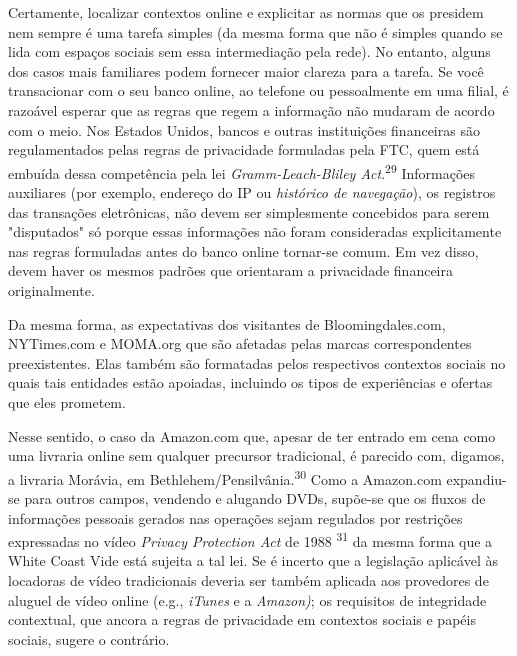 Certamente, localizar contextos online e explicitar as normas que os
presidem nem sempre é uma tarefa simples (da mesma forma que não é
simples quando se lida com espaços sociais sem essa intermediação pela
rede). No entanto, alguns dos casos mais familiares podem fornecer maior
clareza para a tarefa. Se você transacionar com o seu banco online, ao
telefone ou pessoalmente em uma filial, é razoável esperar que as regras
que regem a informação não mudaram de acordo com o meio. Nos Estados
Unidos, bancos e outras instituições financeiras são regulamentados
pelas regras de privacidade formuladas pela FTC, quem está embuída dessa
competência pela lei \emph{Gramm-Leach-Bliley
Act}.\textsuperscript{{29}} Informações auxiliares (por exemplo,
endereço do IP ou \emph{histórico de navegação}), os registros das
transações eletrônicas, não devem ser simplesmente concebidos para serem
"disputados" só porque essas informações não foram consideradas
explicitamente nas regras formuladas antes do banco online tornar-se
comum. Em vez disso, devem haver os mesmos padrões que orientaram a
privacidade financeira originalmente.

Da mesma forma, as expectativas dos visitantes de Bloomingdales.com,
NYTimes.com e MOMA.org que são afetadas pelas marcas correspondentes
preexistentes. Elas também são formatadas pelos respectivos contextos
sociais no quais tais entidades estão apoiadas, incluindo os tipos de
experiências e ofertas que eles prometem.

Nesse sentido, o caso da Amazon.com que, apesar de ter entrado em cena
como uma livraria online sem qualquer precursor tradicional, é parecido
com, digamos, a livraria Morávia, em
Bethlehem/Pensilvânia.\textsuperscript{{30}} Como a Amazon.com
expandiu-se para outros campos, vendendo e alugando DVDs, supõe-se que
os fluxos de informações pessoais gerados nas operações sejam regulados
por restrições expressadas no vídeo \emph{Privacy Protection Act} de
1988 \textsuperscript{{31}} da mesma forma que a White Coast Vide está
sujeita a tal lei. Se é incerto que a legislação aplicável às locadoras
de vídeo tradicionais deveria ser também aplicada aos provedores de
aluguel de vídeo online (e.g., \emph{iTunes} e a \emph{Amazon)}; os
requisitos de integridade contextual, que ancora a regras de privacidade
em contextos sociais e papéis sociais, sugere o contrário.

